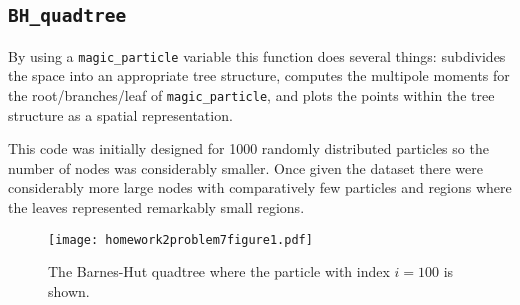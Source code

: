 \subsection*{\texttt{BH\_quadtree}}

By using a \texttt{magic\_particle} variable this function does several things: subdivides the space into an appropriate tree structure, computes the multipole moments for the root/branches/leaf of \texttt{magic\_particle}, and plots the points within the tree structure as a spatial representation.

This code was initially designed for 1000 randomly distributed particles so the number of nodes was considerably smaller. Once given the dataset there were considerably more large nodes with comparatively few particles and regions where the leaves represented remarkably small regions.





\clearpage

\begin{figure}[h]
    \centering
    \texttt{[image: homework2problem7figure1.pdf]}
    \caption{The Barnes-Hut quadtree where the particle with index $i=100$ is shown.}
    \label{fig:271}
\end{figure}

\clearpage
